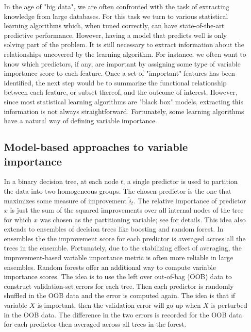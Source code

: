 \documentclass[12pt]{article}
\begin{document}
In the age of "big data", we are often confronted with the task of extracting knowledge from large databases. For this task we turn to various statistical learning algorithms which, when tuned correctly, can have state-of-the-art predictive performance. However, having a model that predicts well is only solving part of the problem. It is still necessary to extract information about the relationships uncovered by the learning algorithm. For instance, we often want to know which predictors, if any, are important by assigning some type of variable importance score to each feature. Once a set of "important" features has been identified, the next step would be to summarize the functional relationship between each feature, or subset thereof, and the outcome of interest. However, since most statistical learning algorithms are "black box" models, extracting this information is not always straightforward. Fortunately, some learning algorithms have a natural way of defining variable importance.


\subsection{Model-based approaches to variable importance}

In a binary decision tree, at each node $t$, a single predictor is used to partition the data into two homogeneous groups. The chosen predictor is the one that maximizes some measure of improvement $\widehat{i}_t$. The relative importance of predictor $x$ is just the sum of the squared improvements over all internal nodes of the tree for which $x$ was chosen as the partitioning variable; see \citet{classification-breiman-1984} for details. This idea also extends to ensembles of decision trees like boosting and random forest. In ensembles the the improvement score for each predictor is averaged across all the trees in the ensemble. Fortunately, due to the stabilizing effect of averaging, the improvement-based variable importance metric is often more reliable in large ensembles. Random forests offer an additional way to compute variable importance scores. The idea is to use the left over out-of-bag (OOB) data to construct validation-set errors for each tree. Then each predictor is randomly shuffled in the OOB data and the error is computed again. The idea is that if variable $X$ is important, then the validation error will go up when $X$ is perturbed in the OOB data. The difference in the two errors is recorded for the OOB data for each predictor then averaged across all trees in the forest.
\end{document}
